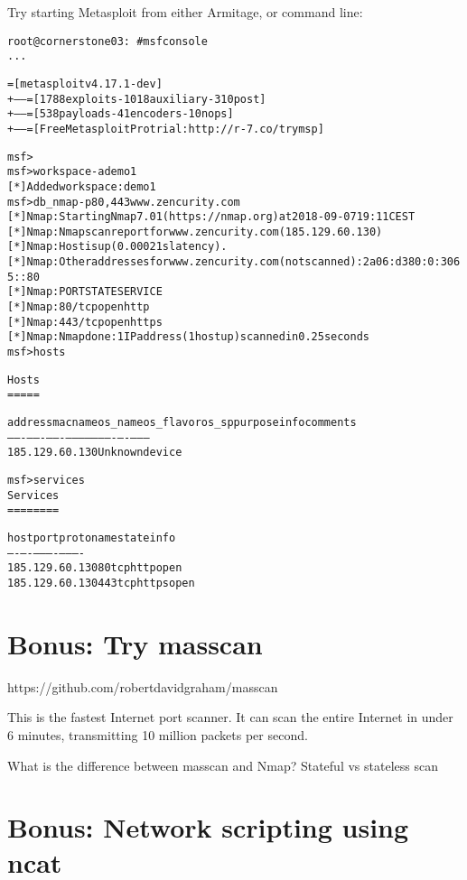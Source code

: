 \documentclass[a4paper,11pt,notitlepage]{report}
\begin{document}
Try starting Metasploit from either Armitage, or command line:
\begin{alltt}
root@cornerstone03:~# msfconsole
...

       =[ metasploit v4.17.1-dev                          ]
+ -- --=[ 1788 exploits - 1018 auxiliary - 310 post       ]
+ -- --=[ 538 payloads - 41 encoders - 10 nops            ]
+ -- --=[ Free Metasploit Pro trial: http://r-7.co/trymsp ]

msf >
msf > workspace -a demo1
[*] Added workspace: demo1
msf > db_nmap -p 80,443 www.zencurity.com
[*] Nmap: Starting Nmap 7.01 ( https://nmap.org ) at 2018-09-07 19:11 CEST
[*] Nmap: Nmap scan report for www.zencurity.com (185.129.60.130)
[*] Nmap: Host is up (0.00021s latency).
[*] Nmap: Other addresses for www.zencurity.com (not scanned): 2a06:d380:0:3065::80
[*] Nmap: PORT    STATE SERVICE
[*] Nmap: 80/tcp  open  http
[*] Nmap: 443/tcp open  https
[*] Nmap: Nmap done: 1 IP address (1 host up) scanned in 0.25 seconds
msf > hosts

Hosts
=====

address         mac  name  os_name  os_flavor  os_sp  purpose  info  comments
-------         ---  ----  -------  ---------  -----  -------  ----  --------
185.129.60.130             Unknown                    device

msf > services
Services
========

host            port  proto  name   state  info
----            ----  -----  ----   -----  ----
185.129.60.130  80    tcp    http   open
185.129.60.130  443   tcp    https  open
\end{alltt}

\chapter{Bonus: Try masscan}

https://github.com/robertdavidgraham/masscan

This is the fastest Internet port scanner. It can scan the entire Internet in under 6 minutes, transmitting 10 million packets per second.

What is the difference between masscan and Nmap? Stateful vs stateless scan




\chapter{Bonus: Network scripting using ncat}
\label{ex:netcat-1}
\end{document}
